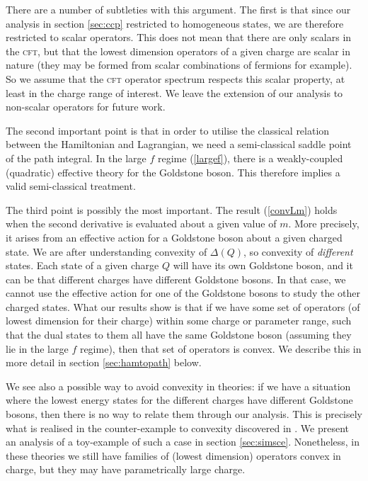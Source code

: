 \documentclass[11pt]{article}
\numberwithin{equation}{section}
\begin{document}
There are a number of subtleties with this argument. The first is that since our analysis in section \ref{sec:ccp} restricted to homogeneous states, we are therefore restricted to scalar operators. This does not mean that there are only scalars in the \textsc{cft}, but that the lowest dimension operators of a given charge are scalar in nature (they may be formed from scalar combinations of fermions for example). So we assume that the \textsc{cft} operator spectrum respects this scalar property, at least in the charge range of interest. We leave the extension of our analysis to non-scalar operators for future work.

The second important point is that in order to utilise the classical relation between the Hamiltonian and Lagrangian, we need a semi-classical saddle point of the path integral. In the large $f$ regime (\ref{largef}), there is a weakly-coupled (quadratic) effective theory for the Goldstone boson. This therefore implies a valid semi-classical treatment. 

The third point is possibly the most important. The result (\ref{convLm}) holds when the second derivative is evaluated about a given value of $m$. More precisely, it arises from an effective action for a Goldstone boson about a given charged state. We are after understanding convexity of $\Delta(Q)$, so convexity of {\it different} states. Each state of a given charge $Q$ will have its own Goldstone boson, and it can be that different charges have different Goldstone bosons. In that case, we cannot use the effective action for one of the Goldstone bosons to study the other charged states. What our results show is that if we have some set of operators (of lowest dimension for their charge) within some charge or parameter range, such that the dual states to them all have the same Goldstone boson (assuming they lie in the large $f$ regime), then that set of operators is convex. We describe this in more detail in section \ref{sec:hamtopath} below.

We see also a possible way to avoid convexity in theories: if we have a situation where the lowest energy states for the different charges have different Goldstone bosons, then there is no way to relate them through our analysis. This is precisely what is realised in the counter-example to convexity discovered in \cite{Sharon:2023drx}. We present an analysis of a toy-example of such a case in section \ref{sec:simsce}. Nonetheless, in these theories we still have families of (lowest dimension) operators convex in charge, but they may have parametrically large charge. 
\end{document}
